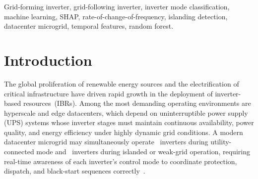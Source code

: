 \documentclass[journal]{IEEEtran}
\newcommand{\gfl}{\text{GFL}}
\newcommand{\gfm}{\text{GFM}}
\begin{document}
\begin{abstract}
External validation on NREL laboratory fuel cell inverter data~\cite{b_nrel253}
(GFL/GFM/transition operation, 110 experiments, zero retraining) yields
F1-binary (GFL/GFM)\,=\,$0.310$ zero-shot and $0.945$ with mixed training
($\leq$\,109 labeled hardware samples), confirming that the domain gap
is addressable with minimal real-world annotation.
Under non-Gaussian sensor noise ($\sigma = 20\%$) and $10\%$ missing data,
F1-macro degrades by only $7.8\%$ relative.
Inference latency of $14.2$~ms (200-estimator relay-optimized model)
is $139\times$ below the IEEE~1547-2018
detection limit and satisfies the $<20$\,ms numerical protective relay
requirement, with an F1-macro penalty of $0.0007$ relative to the full model.
The proposed approach targets \emph{supervisory monitoring} (e.g., energy
management systems) rather than primary protection, where mode awareness
supports dispatch decisions and post-event analysis.
\end{abstract}

\begin{IEEEkeywords}
Grid-forming inverter, grid-following inverter, inverter mode classification,
machine learning, SHAP, rate-of-change-of-frequency, islanding detection,
datacenter microgrid, temporal features, random forest.
\end{IEEEkeywords}

\section{Introduction}
\label{sec:intro}

The global proliferation of renewable energy sources and the electrification
of critical infrastructure have driven rapid growth in the deployment of
inverter-based resources~(IBRs).
Among the most demanding operating environments are hyperscale and
edge datacenters, which depend on uninterruptible power supply (UPS)
systems whose inverter stages must maintain continuous availability,
power quality, and energy efficiency under highly dynamic grid conditions.
A modern datacenter microgrid may simultaneously operate \gfl~inverters
during utility-connected mode and \gfm~inverters during islanded or
weak-grid operation, requiring real-time awareness of each inverter's
control mode to coordinate protection, dispatch, and black-start
sequences correctly~\cite{b_rocabert2012}.
\end{document}
